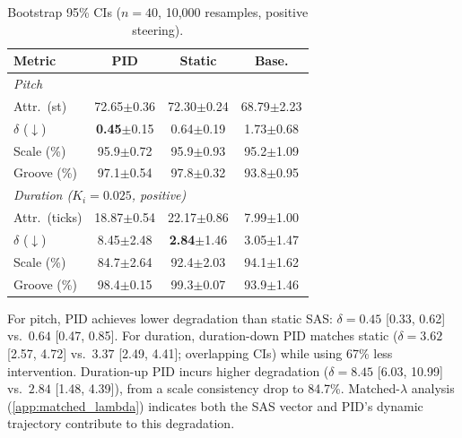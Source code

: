 \documentclass{article}
\theoremstyle{plain}
\begin{document}
\begin{table}[h]
  \caption{Bootstrap 95\% CIs ($n{=}40$, 10,000 resamples, positive steering).}
  \label{tab:ci}
  \begin{center}
  \begin{small}
  \begin{tabular}{lccc}
    \toprule
    Metric & PID & Static & Base. \\
    \midrule
    \multicolumn{4}{l}{\textit{Pitch}} \\
    Attr.\ (st) & 72.65{\scriptsize$\pm$0.36} & 72.30{\scriptsize$\pm$0.24} & 68.79{\scriptsize$\pm$2.23} \\
    $\delta$ ($\downarrow$) & \textbf{0.45}{\scriptsize$\pm$0.15} & 0.64{\scriptsize$\pm$0.19} & 1.73{\scriptsize$\pm$0.68} \\
    Scale (\%) & 95.9{\scriptsize$\pm$0.72} & 95.9{\scriptsize$\pm$0.93} & 95.2{\scriptsize$\pm$1.09} \\
    Groove (\%) & 97.1{\scriptsize$\pm$0.54} & 97.8{\scriptsize$\pm$0.32} & 93.8{\scriptsize$\pm$0.95} \\
    \midrule
    \multicolumn{4}{l}{\textit{Duration ($K_i{=}0.025$, positive)}} \\
    Attr.\ (ticks) & 18.87{\scriptsize$\pm$0.54} & 22.17{\scriptsize$\pm$0.86} & 7.99{\scriptsize$\pm$1.00} \\
    $\delta$ ($\downarrow$) & 8.45{\scriptsize$\pm$2.48} & \textbf{2.84}{\scriptsize$\pm$1.46} & 3.05{\scriptsize$\pm$1.47} \\
    Scale (\%) & 84.7{\scriptsize$\pm$2.64} & 92.4{\scriptsize$\pm$2.03} & 94.1{\scriptsize$\pm$1.62} \\
    Groove (\%) & 98.4{\scriptsize$\pm$0.15} & 99.3{\scriptsize$\pm$0.07} & 93.9{\scriptsize$\pm$1.46} \\
    \bottomrule
  \end{tabular}
  \end{small}
  \end{center}
\end{table}

For pitch, PID achieves lower degradation than static SAS: $\delta{=}0.45$ [0.33, 0.62] vs.\ $0.64$ [0.47, 0.85]. For duration, duration-down PID matches static ($\delta{=}3.62$ [2.57, 4.72] vs.\ $3.37$ [2.49, 4.41]; overlapping CIs) while using 67\% less intervention. Duration-up PID incurs higher degradation ($\delta{=}8.45$ [6.03, 10.99] vs.\ $2.84$ [1.48, 4.39]), from a scale consistency drop to 84.7\%. Matched-$\lambda$ analysis (\cref{app:matched_lambda}) indicates both the SAS vector and PID's dynamic trajectory contribute to this degradation.
\end{document}
